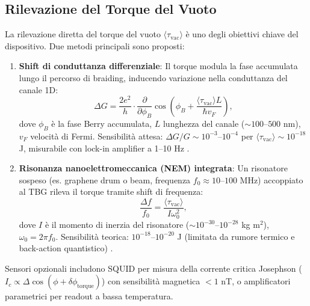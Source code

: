 \documentclass[11pt,a4paper]{article}
\let\oldcite\cite
\renewcommand{\cite}{\protect\oldcite}
\theoremstyle{plain}
\theoremstyle{definition}
\begin{document}
\vspace{0.7cm}

\subsection{Rilevazione del Torque del Vuoto}

La rilevazione diretta del torque del vuoto $\langle \tau_{\text{vac}} \rangle$ è uno degli obiettivi chiave del dispositivo. Due metodi principali sono proposti:

\begin{enumerate}
    \item \textbf{Shift di conduttanza differenziale}: Il torque modula la fase accumulata lungo il percorso di braiding, inducendo variazione nella conduttanza del canale 1D:
    \begin{equation}
    \Delta G = \frac{2e^2}{h} \cdot \frac{\partial}{\partial \phi_B} \cos\left( \phi_B + \frac{\langle \tau_{\text{vac}} \rangle L}{\hbar v_F} \right),
    \label{eq:conductance_shift}
    \end{equation}
    dove $\phi_B$ è la fase Berry accumulata, $L$ lunghezza del canale ($\sim 100$–$500$ nm), $v_F$ velocità di Fermi. Sensibilità attesa: $\Delta G / G \sim 10^{-3}$--$10^{-4}$ per $\langle \tau_{\text{vac}} \rangle \sim 10^{-18}$ J, misurabile con lock-in amplifier a 1–10 Hz \cite{regal2008measurement}.
    
    \item \textbf{Risonanza nanoelettromeccanica (NEM) integrata}: Un risonatore sospeso (es. graphene drum o beam, frequenza $f_0 \approx 10$–$100$ MHz) accoppiato al TBG rileva il torque tramite shift di frequenza:
    \begin{equation}
    \frac{\Delta f}{f_0} = \frac{\langle \tau_{\text{vac}} \rangle}{I \omega_0^2},
    \label{eq:nem_shift}
    \end{equation}
    dove $I$ è il momento di inerzia del risonatore ($\sim 10^{-30}$--$10^{-28}$ kg m$^2$), $\omega_0 = 2\pi f_0$. Sensibilità teorica: $10^{-18}$--$10^{-20}$ J (limitata da rumore termico e back-action quantistico) \cite{castellanos-gomez2012nanomechanical, cleland2002nanomechanical}.
\end{enumerate}

Sensori opzionali includono SQUID per misura della corrente critica Josephson ($I_c \propto \Delta \cos(\phi + \delta \phi_{\text{torque}})$) con sensibilità magnetica $<1$ nT, o amplificatori parametrici per readout a bassa temperatura.
\end{document}
